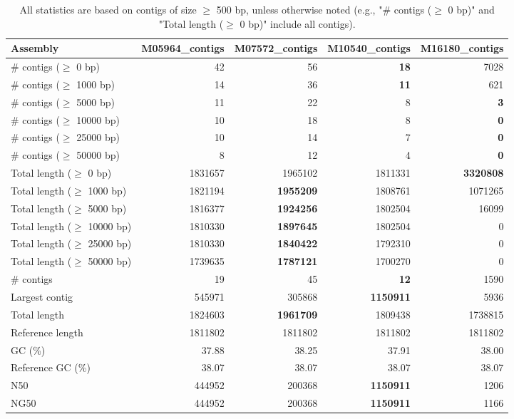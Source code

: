 \documentclass[12pt,a4paper]{article}
\begin{document}
\begin{table}[ht]
\begin{center}
\caption{All statistics are based on contigs of size $\geq$ 500 bp, unless otherwise noted (e.g., "\# contigs ($\geq$ 0 bp)" and "Total length ($\geq$ 0 bp)" include all contigs).}
\begin{tabular}{|l*{4}{|r}|}
\hline
Assembly & M05964\_contigs & M07572\_contigs & M10540\_contigs & M16180\_contigs \\ \hline
\# contigs ($\geq$ 0 bp) & 42 & 56 & {\bf 18} & 7028 \\ \hline
\# contigs ($\geq$ 1000 bp) & 14 & 36 & {\bf 11} & 621 \\ \hline
\# contigs ($\geq$ 5000 bp) & 11 & 22 & 8 & {\bf 3} \\ \hline
\# contigs ($\geq$ 10000 bp) & 10 & 18 & 8 & {\bf 0} \\ \hline
\# contigs ($\geq$ 25000 bp) & 10 & 14 & 7 & {\bf 0} \\ \hline
\# contigs ($\geq$ 50000 bp) & 8 & 12 & 4 & {\bf 0} \\ \hline
Total length ($\geq$ 0 bp) & 1831657 & 1965102 & 1811331 & {\bf 3320808} \\ \hline
Total length ($\geq$ 1000 bp) & 1821194 & {\bf 1955209} & 1808761 & 1071265 \\ \hline
Total length ($\geq$ 5000 bp) & 1816377 & {\bf 1924256} & 1802504 & 16099 \\ \hline
Total length ($\geq$ 10000 bp) & 1810330 & {\bf 1897645} & 1802504 & 0 \\ \hline
Total length ($\geq$ 25000 bp) & 1810330 & {\bf 1840422} & 1792310 & 0 \\ \hline
Total length ($\geq$ 50000 bp) & 1739635 & {\bf 1787121} & 1700270 & 0 \\ \hline
\# contigs & 19 & 45 & {\bf 12} & 1590 \\ \hline
Largest contig & 545971 & 305868 & {\bf 1150911} & 5936 \\ \hline
Total length & 1824603 & {\bf 1961709} & 1809438 & 1738815 \\ \hline
Reference length & 1811802 & 1811802 & 1811802 & 1811802 \\ \hline
GC (\%) & 37.88 & 38.25 & 37.91 & 38.00 \\ \hline
Reference GC (\%) & 38.07 & 38.07 & 38.07 & 38.07 \\ \hline
N50 & 444952 & 200368 & {\bf 1150911} & 1206 \\ \hline
NG50 & 444952 & 200368 & {\bf 1150911} & 1166 \\ \hline

\end{tabular}
\end{center}
\end{table}
\end{document}
